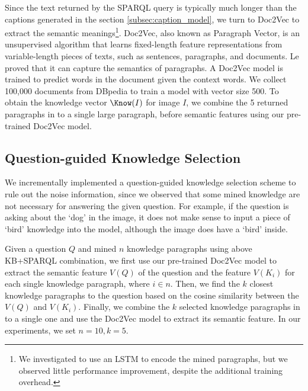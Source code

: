 Since the text returned by the SPARQL query is typically much longer than the captions generated in the section \ref{subsec:caption_model}, we turn to Doc2Vec \cite{le2014distributed} to extract the semantic meanings\footnote{We investigated to use an LSTM to encode the mined paragraphs, but we observed little performance improvement, despite the additional training overhead.}. Doc2Vec, also known as Paragraph Vector, is an unsupervised algorithm that learns fixed-length feature representations from variable-length pieces of texts, such as sentences, paragraphs, and documents. Le \etal \cite{le2014distributed}  proved that it can capture the semantics of paragraphs. A Doc2Vec model is trained to predict words in the document given the context words. We collect 100,000 documents from  DBpedia to train a model with vector size 500. To obtain the knowledge vector $\Know(I)$ for image $I$, we combine the 5 returned paragraphs in to a single large paragraph, before semantic features using our pre-trained Doc2Vec model.

\vspace{-10pt}
\subsection{Question-guided Knowledge Selection}
\label{subsec:selected}
We incrementally implemented a question-guided knowledge selection scheme to rule out the noise information, since we observed that some mined knowledge are not necessary for answering the given question. For example, if the question is asking about the `dog' in the image, it does not make sense to input a piece of `bird' knowledge into the model, although the image does have a `bird' inside.

Given a question $Q$ and mined $n$ knowledge paragraphs using above KB+SPARQL combination, we first use our pre-trained Doc2Vec model to extract the semantic feature $V(Q)$ of the question and the feature $V(K_i)$ for each single knowledge paragraph, where $i \in n$. Then, we find the $k$ closest knowledge paragraphs to the question based on the cosine similarity between the $V(Q)$ and $V(K_i)$. Finally, we combine the $k$ selected knowledge paragraphs in to a single one and use the Doc2Vec model to extract its semantic feature. In our experiments, we set $n=10, k=5$.

